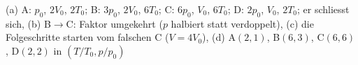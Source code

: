 (a) A: $p_0$, $2V_0$, $2T_0$; B: $3p_0$, $2V_0$, $6T_0$; C: $6p_0$, $V_0$, $6T_0$; D: $2p_0$, $V_0$, $2T_0$; er schliesst sich, (b) B$\to$C: Faktor umgekehrt ($p$ halbiert statt verdoppelt), (c) die Folgeschritte starten vom falschen C ($V = 4V_0$), (d) A$(2,1)$, B$(6,3)$, C$(6,6)$, D$(2,2)$ in $(T/T_0, p/p_0)$
